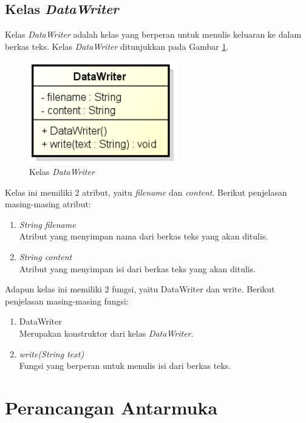 \subsection{Kelas \textit{DataWriter}}

Kelas \textit{DataWriter} adalah kelas yang berperan untuk menulis keluaran ke dalam berkas teks. Kelas \textit{DataWriter} ditunjukkan pada Gambar \ref{fig:classdatawriter}.

\begin{figure}[H]
	\centering
	\includegraphics[scale=0.8]{Gambar/class_data_writer}
	\caption{Kelas \textit{DataWriter}}\label{fig:classdatawriter}
\end{figure}

Kelas ini memiliki 2 atribut, yaitu \textit{filename} dan \textit{content}. Berikut penjelasan masing-masing atribut:

\begin{enumerate}
	\item \textit{String filename} \\
	Atribut yang menyimpan nama dari berkas teks yang akan ditulis.
	\item \textit{String content} \\
	Atribut yang menyimpan isi dari berkas teks yang akan ditulis.
\end{enumerate}

Adapun kelas ini memiliki 2 fungsi, yaitu DataWriter dan write. Berikut penjelasan masing-masing fungsi:

\begin{enumerate}
	\item DataWriter \\
	Merupakan konstruktor dari kelas \textit{DataWriter}.
	\item \textit{write(String text)} \\
	Fungsi yang berperan untuk menulis isi dari berkas teks.
\end{enumerate}

\section{Perancangan Antarmuka}

